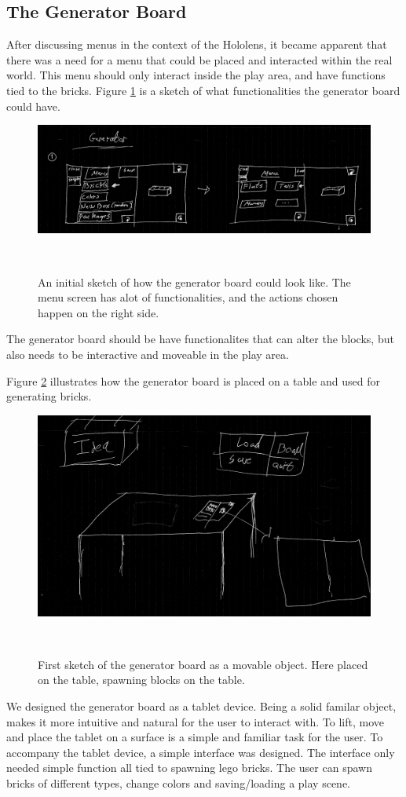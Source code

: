 \subsection{The Generator Board}
After discussing menus in the context of the Hololens, it became apparent that there was a need for a menu that could be placed and interacted within the real world. This menu should only interact inside the play area, and have functions tied to the bricks. Figure \ref{fig:genboard1} is a sketch of what functionalities the generator board could have.
\begin{figure}[h]
	\centering
	\includegraphics[width=0.7\columnwidth]{figures/Generator/gen5.png}
	\caption{An initial sketch of how the generator board could look like. The menu screen has alot of functionalities, and the actions chosen happen on the right side.}~\label{fig:genboard1}
\end{figure}
The generator board should be have functionalites that can alter the blocks, but also needs to be interactive and moveable in the play area.\par
Figure \ref{fig:gentablet} illustrates how the generator board is placed on a table and used for generating bricks.
\begin{figure}[h]
	\centering
	\includegraphics[width=0.7\columnwidth]{figures/Generator/gen6.png}
	\caption{First sketch of the generator board as a movable object. Here placed on the table, spawning blocks on the table.}~\label{fig:gentablet}
\end{figure}
We designed the generator board as a tablet device. Being a solid familar object, makes it more intuitive and natural for the user to interact with. To lift, move and place the tablet on a surface is a simple and familiar task for the user. To accompany the tablet device, a simple interface was designed. The interface only needed simple function all tied to spawning lego bricks. The user can spawn bricks of different types, change colors and saving/loading a play scene.
